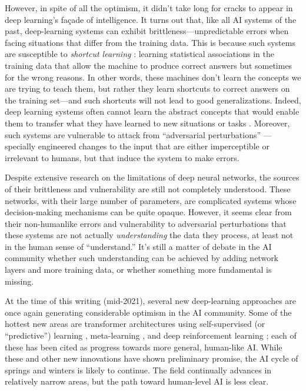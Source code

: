 \documentclass[12pt]{article}
\begin{document}
However, in spite of all the optimism, it didn't take long for cracks to appear in deep learning's fa\c{c}ade of intelligence. It turns out that, like all AI systems of the past, deep-learning systems can exhibit brittleness---unpredictable errors when facing situations that differ from the training data.  This is because such systems are susceptible to \textit{shortcut learning} \cite{Geirhos2020,Lapuschkin2019}: learning statistical associations in the training data that allow the machine to produce correct answers but sometimes for the wrong reasons.  In other words, these machines  don't learn the concepts we are trying to teach them, but rather they learn shortcuts to correct answers on the training set---and such shortcuts will not lead to good generalizations.  Indeed, deep learning systems often cannot learn the abstract concepts that would enable them to transfer what they have learned to new situations or tasks \cite{Mitchell2021}. Moreover, such systems are vulnerable to attack from ``adversarial perturbations'' \cite{Moosavi2017}---specially engineered changes to the input that are either imperceptible or irrelevant to humans, but that induce the system to make errors.

Despite extensive research on the limitations of deep neural networks, the sources of their brittleness and vulnerability are still not completely understood. These  networks, with their large number of parameters, are complicated systems whose decision-making mechanisms can be quite opaque. However, it seems clear from their non-humanlike errors and vulnerability to adversarial perturbations that these systems are not actually \textit{understanding} the data they process, at least not in the human sense of ``understand.''  It's still a matter of debate in the AI community whether such understanding can be achieved by adding network layers and more training data, or whether something more fundamental is missing.

At the time of this writing (mid-2021), several new deep-learning approaches are once again generating considerable optimism in the AI community.  Some of the hottest new areas are transformer architectures using self-supervised (or ``predictive'') learning \cite{Devlin2018}, meta-learning \cite{Finn2017}, and deep reinforcement learning \cite{Arulkumaran2017}; each of these has been cited as progress towards more general, human-like AI. While these and other new innovations have shown preliminary promise, the AI cycle of springs and winters is likely to continue.  The field continually advances in relatively narrow areas, but the path toward human-level AI is less clear.  
\end{document}
